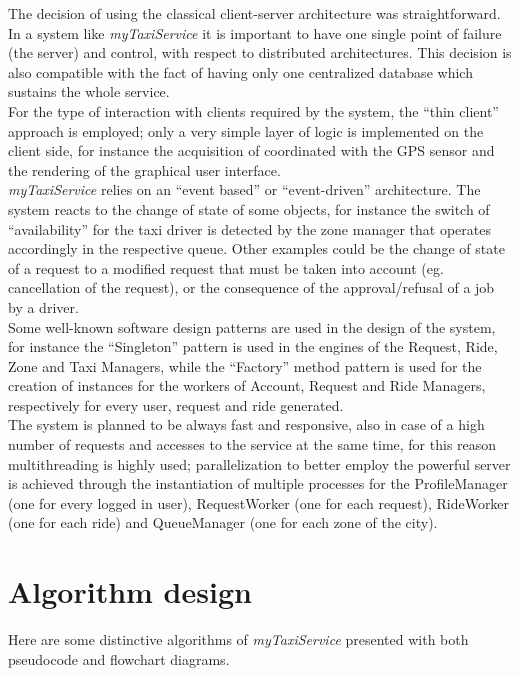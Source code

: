 \documentclass[a4paper,11pt]{report} %
\newcommand{\mts}{\mbox{\normalfont\itshape myTaxiService}}
\begin{document}
	The decision of using the classical client-server architecture was straightforward. In a system like \mts{} it is important to have one single point of failure (the server) and control, with respect to distributed architectures. This decision is also compatible with the fact of having only one centralized database which sustains the whole service.\\
	For the type of interaction with clients required by the system, the ``thin client'' approach is employed; only a very simple layer of logic is implemented on the client side, for instance the acquisition of coordinated with the GPS sensor and the rendering of the graphical user interface.\\
	\mts{} relies on an ``event based'' or ``event-driven'' architecture. The system reacts to the change of state of some objects, for instance the switch of ``availability'' for the taxi driver is detected by the zone manager that operates accordingly in the respective queue. Other examples could be the change of state of a request to a modified request that must be taken into account (eg. cancellation of the request), or the consequence of the approval/refusal of a job by a driver.\\
	Some well-known software design patterns are used in the design of the system, for instance the ``Singleton'' pattern is used in the engines of the Request, Ride, Zone and Taxi Managers, while the ``Factory'' method pattern is used for the creation of instances for the workers of Account, Request and Ride Managers, respectively for every user, request and ride generated.\\
	The system is planned to be always fast and responsive, also in case of a high number of requests and accesses to the service at the same time, for this reason multithreading is highly used; parallelization to better employ the powerful server is achieved through the instantiation of multiple processes for the ProfileManager (one for every logged in user), RequestWorker (one for each request), RideWorker (one for each ride) and QueueManager (one for each zone of the city). 
		

	\section{Algorithm design}
	Here are some distinctive algorithms of \mts{} presented with both pseudocode and flowchart diagrams.
\end{document}
